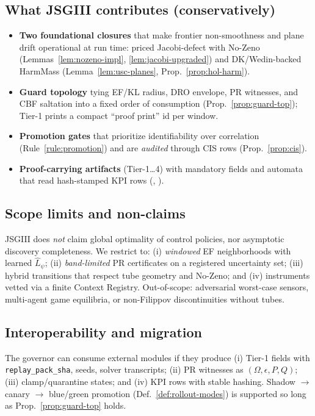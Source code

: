 \subsection{What JSGIII contributes (conservatively)}\label{subsec:rel-contrib}
\emph{}
\begin{itemize}[leftmargin=*]
\item \textbf{Two foundational closures} that make frontier non-smoothness and plane drift operational at run time: priced Jacobi-defect with No-Zeno (Lemmas~\ref{lem:nozeno-impl}, \ref{lem:jacobi-upgraded}) and DK/Wedin-backed HarmMass (Lemma~\ref{lem:usc-planes}, Prop.~\ref{prop:hol-harm}).
\item \textbf{Guard topology} tying EF/KL radius, DRO envelope, PR witnesses, and CBF saltation into a fixed order of consumption (Prop.~\ref{prop:guard-top}); Tier-1 prints a compact “proof print” id per window.
\item \textbf{Promotion gates} that prioritize identifiability over correlation (Rule~\ref{rule:promotion}) and are \emph{audited} through CIS rows (Prop.~\ref{prop:cis}).
\item \textbf{Proof-carrying artifacts} (Tier-1…4) with mandatory fields and automata that read hash-stamped KPI rows (, ).
\end{itemize}

\subsection{Scope limits and non-claims}\label{subsec:rel-nonclaims}
\emph{}
JSGIII does \emph{not} claim global optimality of control policies, nor asymptotic discovery completeness. We restrict to: (i) \emph{windowed} EF neighborhoods with learned $\hat L_\psi$; (ii) \emph{band-limited} PR certificates on a registered uncertainty set; (iii) hybrid transitions that respect tube geometry and No-Zeno; and (iv) instruments vetted via a finite Context Registry. Out-of-scope: adversarial worst-case sensors, multi-agent game equilibria, or non-Filippov discontinuities without tubes.

\subsection{Interoperability and migration}\label{subsec:rel-migrate}
\emph{}
The governor can consume external modules if they produce (i) Tier-1 fields with \texttt{replay\_pack\_sha}, seeds, solver transcripts; (ii) PR witnesses as $(\Omega,\epsilon,P,Q)$; (iii) clamp/quarantine states; and (iv) KPI rows with stable hashing. Shadow $\rightarrow$ canary $\rightarrow$ blue/green promotion (Def.~\ref{def:rollout-modes}) is supported so long as Prop.~\ref{prop:guard-top} holds.

